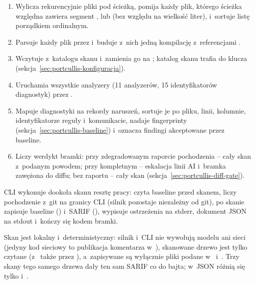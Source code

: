\begin{enumerate}[leftmargin=*]
  \item Wylicza rekurencyjnie pliki  pod ścieżką, pomija każdy plik, którego
        ścieżka względna zawiera segment ,  lub 
        (bez względu na wielkość liter), i~sortuje listę porządkiem ordinalnym.
  \item Parsuje każdy plik przez  i~buduje z~nich
        jedną kompilację  z~referencjami
        .
  \item Wczytuje  z~katalogu skanu i~zamienia go na
        ; katalog skanu trafia do klucza
         (sekcja~\ref{sec:portcullis-konfiguracja}).
  \item Uruchamia wszystkie analyzery  (11 analyzerów,
        15 identyfikatorów diagnostyk) przez .
  \item Mapuje diagnostyki na rekordy naruszeń, sortuje je po pliku, linii, kolumnie,
        identyfikatorze reguły i~komunikacie, nadaje fingerprinty
        (sekcja~\ref{sec:portcullis-baseline}) i~oznacza findingi akceptowane przez
        baseline.
  \item Liczy werdykt bramki: przy zdegradowanym raporcie pochodzenia -- cały skan
        z~podanym powodem; przy kompletnym -- eskalacja linii AI i~bramka zawężona do
        diffu; bez raportu -- cały skan (sekcja~\ref{sec:portcullis-diff-gate}).
\end{enumerate}

CLI wykonuje dookoła skanu resztę pracy: czyta baseline przed skanem, liczy pochodzenie
z~git na granicy CLI (silnik pozostaje niezależny od git), po skanie zapisuje baseline
() i~SARIF (), wypisuje ostrzeżenia na stderr,
dokument JSON na stdout i~kończy się kodem bramki.

Skan jest lokalny i~deterministyczny: silnik i~CLI nie wywołują modelu ani sieci (jedyny kod
sieciowy to publikacja komentarza w~), skanowane drzewo jest
tylko czytane (z~ także przez ), a~zapisywane są
wyłącznie pliki podane w~ i~. Trzy skany tego samego
drzewa dały ten sam SARIF co do bajta; w~JSON różnią się tylko 
i~.

